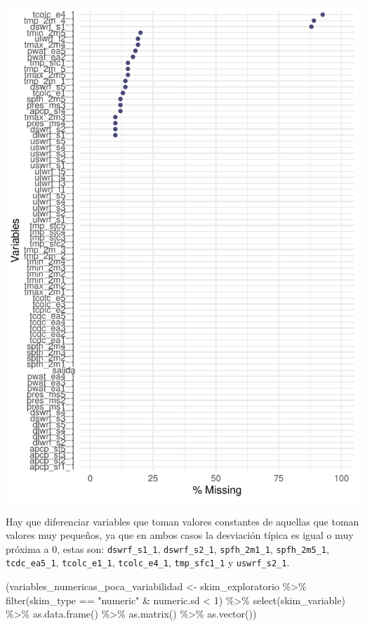 \documentclass[
  11pt,
  a4paper,
]{article}
\newenvironment{Shaded}{\begin{snugshade}}{\end{snugshade}}
\newcommand{\DecValTok}[1]{\textcolor[rgb]{0.00,0.00,0.81}{#1}}
\newcommand{\FunctionTok}[1]{\textcolor[rgb]{0.00,0.00,0.00}{#1}}
\newcommand{\NormalTok}[1]{#1}
\newcommand{\OtherTok}[1]{\textcolor[rgb]{0.56,0.35,0.01}{#1}}
\newcommand{\SpecialCharTok}[1]{\textcolor[rgb]{0.00,0.00,0.00}{#1}}
\newcommand{\StringTok}[1]{\textcolor[rgb]{0.31,0.60,0.02}{#1}}
\begin{document}
\begin{center}\includegraphics{memoria_practica_1_files/figure-latex/unnamed-chunk-4-1} \end{center}

Hay que diferenciar variables que toman valores constantes de aquellas
que toman valores muy pequeños, ya que en ambos casos la desviación
típica es igual o muy próxima a 0, estas son: \texttt{dswrf\_s1\_1},
\texttt{dswrf\_s2\_1}, \texttt{spfh\_2m1\_1}, \texttt{spfh\_2m5\_1},
\texttt{tcdc\_ea5\_1}, \texttt{tcolc\_e1\_1}, \texttt{tcolc\_e4\_1},
\texttt{tmp\_sfc1\_1} y \texttt{uswrf\_s2\_1}.

\begin{Shaded}
\begin{Highlighting}[]
\NormalTok{(variables\_numericas\_poca\_variabilidad }\OtherTok{\textless{}{-}}\NormalTok{ skim\_exploratorio }\SpecialCharTok{\%\textgreater{}\%} \FunctionTok{filter}\NormalTok{(skim\_type }\SpecialCharTok{==} \StringTok{"numeric"} \SpecialCharTok{\&}\NormalTok{ numeric.sd }\SpecialCharTok{\textless{}} \DecValTok{1}\NormalTok{) }\SpecialCharTok{\%\textgreater{}\%} \FunctionTok{select}\NormalTok{(skim\_variable) }\SpecialCharTok{\%\textgreater{}\%} \FunctionTok{as.data.frame}\NormalTok{() }\SpecialCharTok{\%\textgreater{}\%} \FunctionTok{as.matrix}\NormalTok{() }\SpecialCharTok{\%\textgreater{}\%} \FunctionTok{as.vector}\NormalTok{())}
\end{Highlighting}
\end{Shaded}
\end{document}
